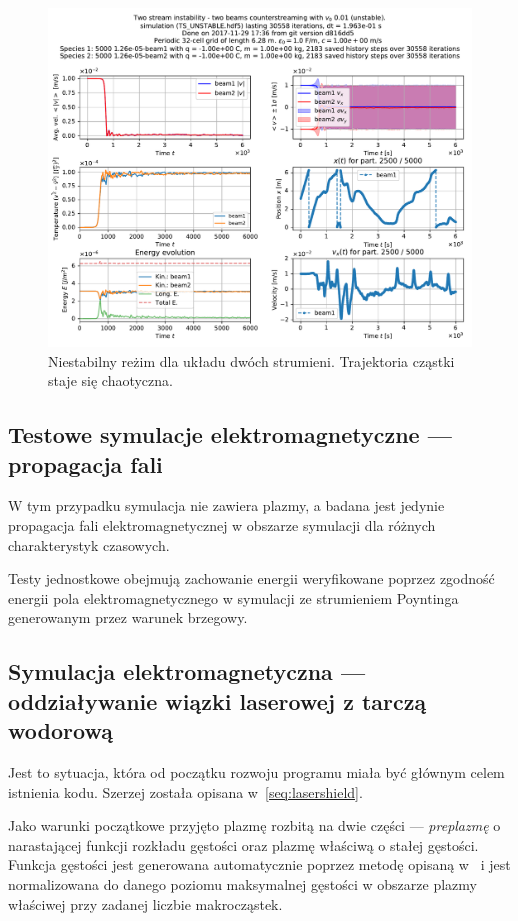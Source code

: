 \begin{figure}[h!]
  \includegraphics[width=\textwidth]{Images/TS_UNSTABLE}
  \caption{Niestabilny reżim dla układu dwóch strumieni. Trajektoria cząstki staje się chaotyczna.\label{fig:twostream-unstable}}
\end{figure}

\subsection{Testowe symulacje elektromagnetyczne --- propagacja fali}
W tym przypadku symulacja nie zawiera plazmy, a badana jest jedynie propagacja fali elektromagnetycznej w obszarze
symulacji dla różnych charakterystyk czasowych. 

Testy jednostkowe obejmują zachowanie energii weryfikowane poprzez zgodność
energii pola elektromagnetycznego w symulacji ze strumieniem Poyntinga generowanym
przez warunek brzegowy. %


\subsection{Symulacja elektromagnetyczna --- oddziaływanie wiązki laserowej z tarczą wodorową}

Jest to sytuacja, która od początku rozwoju programu miała być głównym celem istnienia kodu. Szerzej została opisana w~\ref{seq:lasershield}.

Jako warunki początkowe przyjęto plazmę rozbitą na dwie części ---
\emph{preplazmę} o narastającej funkcji rozkładu gęstości oraz plazmę właściwą
o stałej gęstości. Funkcja gęstości jest generowana automatycznie poprzez
metodę opisaną w~\cite{birdsall} i jest normalizowana do danego poziomu
maksymalnej gęstości w obszarze plazmy właściwej przy zadanej liczbie
makrocząstek.

